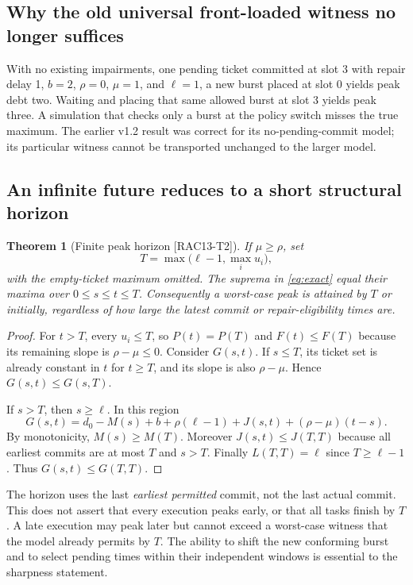 \documentclass[11pt,a4paper]{article}
\newtheorem{theorem}{Theorem}\newtheorem{proposition}[theorem]{Proposition}
\theoremstyle{definition}\newtheorem{definition}{Definition}
\newcommand{\idtag}[1]{\textnormal{\textsf{[#1]}}}
\begin{document}
\subsection{Why the old universal front-loaded witness no longer suffices}
With no existing impairments, one pending ticket committed at slot 3 with repair delay 1, $b=2$, $\rho=0$, $\mu=1$, and $\ell=1$, a new burst placed at slot 0 yields peak debt two. Waiting and placing that same allowed burst at slot 3 yields peak three. A simulation that checks only a burst at the policy switch misses the true maximum. The earlier v1.2 result was correct for its no-pending-commit model; its particular witness cannot be transported unchanged to the larger model.

\subsection{An infinite future reduces to a short structural horizon}
\begin{theorem}[Finite peak horizon \idtag{RAC13-T2}]
\label{thm:horizon}
If $\mu\ge\rho$, set
\begin{equation}
\boxed{T=\max\big(\ell-1,\max_i u_i\big),}
\label{eq:horizon}
\end{equation}
with the empty-ticket maximum omitted. The suprema in \cref{eq:exact} equal their maxima over $0\le s\le t\le T$. Consequently a worst-case peak is attained by $T$ or initially, regardless of how large the latest commit or repair-eligibility times are.
\end{theorem}
\begin{proof}
For $t>T$, every $u_i\le T$, so $P(t)=P(T)$ and $F(t)\le F(T)$ because its remaining slope is $\rho-\mu\le0$. Consider $G(s,t)$. If $s\le T$, its ticket set is already constant in $t$ for $t\ge T$, and its slope is also $\rho-\mu$. Hence $G(s,t)\le G(s,T)$.

If $s>T$, then $s\ge\ell$. In this region
\[
G(s,t)=d_0-M(s)+b+\rho(\ell-1)+J(s,t)+(\rho-\mu)(t-s).
\]
By monotonicity, $M(s)\ge M(T)$. Moreover $J(s,t)\le J(T,T)$ because all earliest commits are at most $T$ and $s>T$. Finally $L(T,T)=\ell$ since $T\ge\ell-1$. Thus $G(s,t)\le G(T,T)$.
\end{proof}
The horizon uses the last \emph{earliest permitted} commit, not the last actual commit. This does not assert that every execution peaks early, or that all tasks finish by $T$. A late execution may peak later but cannot exceed a worst-case witness that the model already permits by $T$. The ability to shift the new conforming burst and to select pending times within their independent windows is essential to the sharpness statement.
\end{document}
